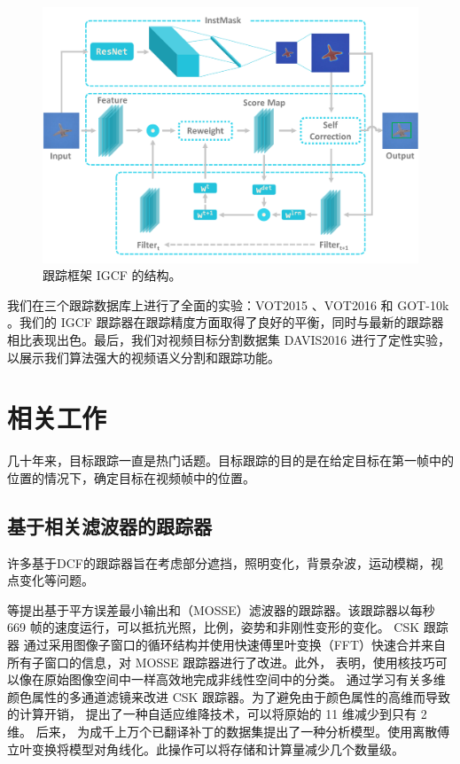 \begin{figure}
    \centering
    \includegraphics[width=1.0\textwidth]{Img/IGCF/instmask1.pdf}
    \caption{跟踪框架 IGCF 的结构。}
    \label{fig:IGCF}
\end{figure}

我们在三个跟踪数据库上进行了全面的实验：VOT2015 \cite{Kristan2015TheVO}、VOT2016 \cite{Kristan2016TheVO} 和 GOT-10k \cite{GOT-10k}。我们的 IGCF 跟踪器在跟踪精度方面取得了良好的平衡，同时与最新的跟踪器相比表现出色。最后，我们对视频目标分割数据集 DAVIS2016 \cite{Perazzi2016} 进行了定性实验，以展示我们算法强大的视频语义分割和跟踪功能。

\section{相关工作}
几十年来，目标跟踪一直是热门话题。目标跟踪的目的是在给定目标在第一帧中的位置的情况下，确定目标在视频帧中的位置。

\subsection{基于相关滤波器的跟踪器}
许多基于DCF的跟踪器旨在考虑部分遮挡，照明变化，背景杂波，运动模糊，视点变化等问题。

\cite{bolme2010visual} 等提出基于平方误差最小输出和（MOSSE）滤波器的跟踪器。该跟踪器以每秒 669 帧的速度运行，可以抵抗光照，比例，姿势和非刚性变形的变化。
CSK 跟踪器 \cite{Henriques2012ExploitingTC} 通过采用图像子窗口的循环结构并使用快速傅里叶变换（FFT）快速合并来自所有子窗口的信息，对 MOSSE 跟踪器进行了改进。此外， \cite{Henriques2012ExploitingTC} 表明，使用核技巧可以像在原始图像空间中一样高效地完成非线性空间中的分类。
\cite{Danelljan2014AdaptiveCA} 通过学习有关多维颜色属性的多通道滤镜来改进 CSK 跟踪器。为了避免由于颜色属性的高维而导致的计算开销，\cite{Danelljan2014AdaptiveCA} 提出了一种自适应维降技术，可以将原始的 11 维减少到只有 2 维。
后来，\cite{henriques2014high-speed} 为成千上万个已翻译补丁的数据集提出了一种分析模型。使用离散傅立叶变换将模型对角线化。此操作可以将存储和计算量减少几个数量级。

